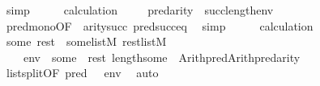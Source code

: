 \begin{isabellebody}
\ {\isacharparenleft}{\kern0pt}simp{\isacharparenright}{\kern0pt}\isanewline
\ \ \isamarkupfalse%
\ \isamarkupfalse%
\ calculation\ \isanewline
\ \ \isamarkupfalse%
\ {\isachardoublequoteopen}pred{\isacharparenleft}{\kern0pt}arity{\isacharparenleft}{\kern0pt}{\isasymphi}{\isacharparenright}{\kern0pt}{\isacharparenright}{\kern0pt}\ {\isasymle}\ succ{\isacharparenleft}{\kern0pt}length{\isacharparenleft}{\kern0pt}env{\isacharparenright}{\kern0pt}{\isacharparenright}{\kern0pt}{\isachardoublequoteclose}\isanewline
\ \ \ \ \isamarkupfalse%
\ pred{\isacharunderscore}{\kern0pt}mono{\isacharbrackleft}{\kern0pt}OF\ {\isacharunderscore}{\kern0pt}\ {\isacartoucheopen}arity{\isacharparenleft}{\kern0pt}{\isasymphi}{\isacharparenright}{\kern0pt}{\isasymle}succ{\isacharparenleft}{\kern0pt}{\isacharunderscore}{\kern0pt}{\isacharparenright}{\kern0pt}{\isacartoucheclose}{\isacharbrackright}{\kern0pt}\ pred{\isacharunderscore}{\kern0pt}succ{\isacharunderscore}{\kern0pt}eq\ \isamarkupfalse%
\ simp\isanewline
\ \ \isamarkupfalse%
\ \isamarkupfalse%
\ calculation\isanewline
\ \ \isamarkupfalse%
\ some\ rest\ \ {\isachardoublequoteopen}some{\isasymin}list{\isacharparenleft}{\kern0pt}M{\isacharparenright}{\kern0pt}{\isachardoublequoteclose}\ {\isachardoublequoteopen}rest{\isasymin}list{\isacharparenleft}{\kern0pt}M{\isacharparenright}{\kern0pt}{\isachardoublequoteclose}\ \isanewline
\ \ \ \ {\isachardoublequoteopen}env\ {\isacharequal}{\kern0pt}\ some\ {\isacharat}{\kern0pt}\ rest{\isachardoublequoteclose}\ {\isachardoublequoteopen}length{\isacharparenleft}{\kern0pt}some{\isacharparenright}{\kern0pt}\ {\isacharequal}{\kern0pt}\ Arith{\isachardot}{\kern0pt}pred{\isacharparenleft}{\kern0pt}Arith{\isachardot}{\kern0pt}pred{\isacharparenleft}{\kern0pt}arity{\isacharparenleft}{\kern0pt}{\isasymphi}{\isacharparenright}{\kern0pt}{\isacharparenright}{\kern0pt}{\isacharparenright}{\kern0pt}{\isachardoublequoteclose}\ \isanewline
\ \ \ \ \isamarkupfalse%
\ list{\isacharunderscore}{\kern0pt}split{\isacharbrackleft}{\kern0pt}OF\ {\isacartoucheopen}pred{\isacharparenleft}{\kern0pt}{\isacharunderscore}{\kern0pt}{\isacharparenright}{\kern0pt}\ {\isasymle}\ {\isacharunderscore}{\kern0pt}{\isacartoucheclose}\ {\isacartoucheopen}env{\isasymin}{\isacharunderscore}{\kern0pt}{\isacartoucheclose}{\isacharbrackright}{\kern0pt}\ \isamarkupfalse%
\ auto\isanewline
\ \ \isamarkupfalse%
\isanewline

\end{isabellebody}
